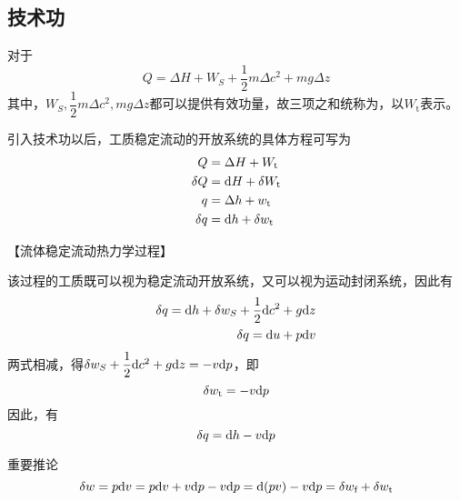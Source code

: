 \subsection{技术功}
\tdefination[技术功]
对于
\begin{equation*}
	Q = \Delta H + W_S +\frac 12 m \Delta c^2 + mg \Delta z
\end{equation*}
其中，$W_S, \dfrac{1}{2}m\Delta c^2, mg \Delta z$都可以提供有效功量，故三项之和统称为，以$W_\text{t}$表示。
\begin{itemizea}
	\item 引入技术功以后，工质稳定流动的开放系统的具体方程可写为\vspace*{-1em}
	\begin{align}
		Q &=\Delta H + W_{\text{t}}\\
		\delta Q &= {\rm{d}} H + \delta W_{\text{t}}\\
		q & = \Delta h + w_{\text{t}}\\
		\delta q &= {\rm{d}} h + \delta w_{\text{t}} 
	\end{align}
\end{itemizea}
\vspace*{1em}
\noindent 【流体稳定流动热力学过程】
\par 该过程的工质既可以视为稳定流动开放系统，又可以视为运动封闭系统，因此有
\begin{align*}
	\delta q ={\rm{d}} h + \delta w_S + \frac{1}{2}{\rm{d}} c^2 + g {\rm{d}} z\\
	\delta q = {\rm{d}} u +p {\rm{d}} v
\end{align*}
两式相减，得$\delta w_S + \dfrac{1}{2} {\rm{d}} c^2 + g {\rm{d}} z = - v {\rm{d}} p$，即
\begin{equation}
	\delta w_{\text{t}} = - v {\rm{d}} p
\end{equation}
因此，有
\begin{equation}
	\delta q = {\rm{d}} h -v {\rm{d}} p
\end{equation}
\begin{itemizea}
	\item 重要推论
	\begin{equation}
		\delta w = p {\rm{d}} v = p {\rm{d}} v + v {\rm{d}} p - v {\rm{d}} p = {\rm{d}}(pv) - v {\rm{d}} p = \delta w_{\text{f}} + \delta w_{\text{t}}
	\end{equation}
\end{itemizea}


